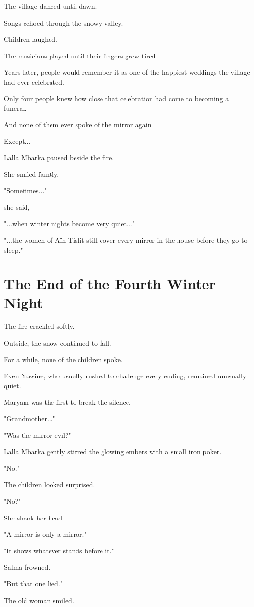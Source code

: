 \documentclass[12pt,openany]{book}
\begin{document}
The village danced until dawn.

Songs echoed through the snowy valley.

Children laughed.

The musicians played until their fingers grew tired.

Years later, people would remember it as one of the happiest weddings the village had ever celebrated.

Only four people knew how close that celebration had come to becoming a funeral.

And none of them ever spoke of the mirror again.

Except...

Lalla Mbarka paused beside the fire.

She smiled faintly.

"Sometimes..."

she said,

"...when winter nights become very quiet..."

"...the women of Aïn Tislit still cover every mirror in the house before they go to sleep."
\section*{The End of the Fourth Winter Night}

The fire crackled softly.

Outside, the snow continued to fall.

For a while, none of the children spoke.

Even Yassine, who usually rushed to challenge every ending, remained unusually quiet.

Maryam was the first to break the silence.

"Grandmother..."

"Was the mirror evil?"

Lalla Mbarka gently stirred the glowing embers with a small iron poker.

"No."

The children looked surprised.

"No?"

She shook her head.

"A mirror is only a mirror."

"It shows whatever stands before it."

Salma frowned.

"But that one lied."

The old woman smiled.
\end{document}

